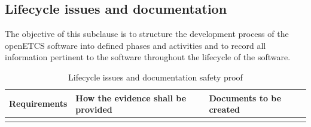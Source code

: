 \documentclass{template/openetcs_report}
\begin{document}
\subsection{Lifecycle issues and documentation}
\label{SDLC2}
\begin{flushleft}
The objective of this subclause is to structure the development process of the openETCS software into defined phases and activities and to record all information pertinent to the software throughout the lifecycle of the software.
\end{flushleft}
{\footnotesize\sffamily\centering
\begin{longtable}{|p{2cm}|p{9cm}|p{3cm}|}
\caption{Lifecycle issues and documentation safety proof}\\
\hline
\bfseries Requirements & \bfseries How the evidence shall be provided & \bfseries Documents to be created\\
\hline
\hline
\endhead
\hline
\endfoot


\end{longtable}}
\end{document}
